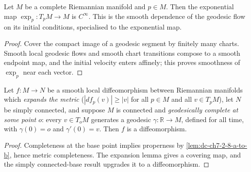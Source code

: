 \begin{lemma}

  \label{lem:dc-ch7-3-expmap-smooth}
  \leanok
Let $M$ be a complete Riemannian manifold and $p\in M$. Then the exponential map
  $\exp_p:T_pM\to M$ is $C^\infty$. This is the smooth dependence of the geodesic flow on its
  initial conditions, specialised to the exponential map.
\begin{proof}

  \leanok
\sketch Cover the compact image of a geodesic segment by finitely many charts. Smooth local geodesic flows and smooth chart transitions compose to a smooth endpoint map, and the initial velocity enters affinely; this proves smoothness of $\exp_p$ near each vector.
\end{proof}
\end{lemma}

\begin{lemma}

  \label{lem:dc-ch7-3-1-assembly}
  \leanok
Let $f:M\to N$ be a smooth local diffeomorphism between Riemannian manifolds which
  \emph{expands the metric} ($|df_p(v)|\ge|v|$ for all $p\in M$ and all $v\in T_pM$), let
  $N$ be simply connected, and suppose $M$ is connected and \emph{geodesically complete at
  some point $o$}: every $v\in T_oM$ generates a geodesic $\gamma:\mathbb R\to M$, defined
  for all time, with $\gamma(0)=o$ and $\gamma'(0)=v$. Then $f$ is a diffeomorphism.
\begin{proof}

  \leanok
\sketch Completeness at the base point implies properness by \cref{lem:dc-ch7-2-8-a-to-b}, hence metric completeness. The expansion lemma gives a covering map, and the simply connected-base result upgrades it to a diffeomorphism.
\end{proof}
\end{lemma}

